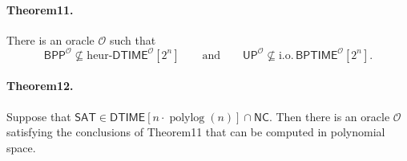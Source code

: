 \documentclass[10pt,a4paper]{article}
\begin{document}
\paragraph{Theorem11.} There is an oracle $\mathcal O$ such that
\[\mathsf{BPP}^{\mathcal O}\not\subseteq\mathrm{heur}\text{-}\mathsf{DTIME}^{\mathcal O}[2^n]\qquad\text{and}\qquad\mathsf{UP}^{\mathcal O}\not\subseteq\mathrm{i.o.}\,\mathsf{BPTIME}^{\mathcal O}[2^n].\]
\paragraph{Theorem12.} Suppose that $\mathsf{SAT}\in\mathsf{DTIME}[n\cdot\operatorname{polylog}(n)]\cap\mathsf{NC}$. Then there is an oracle $\mathcal O$ satisfying the conclusions of Theorem11 that can be computed in polynomial space.
\end{document}
